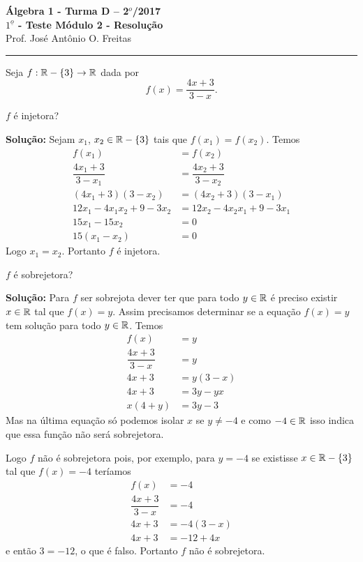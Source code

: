 \documentclass[12pt]{article}
\begin{document}


\begin{center}
{\Large\bf {\'A}lgebra 1 - Turma D -- 2$^{o}$/2017} \\ \vspace{9pt} {\large\bf
  $1^{\underline{o}}$ - Teste Módulo 2 - Resolu\c{c}\~ao}\\
\vspace{9pt} Prof. Jos{\'e} Ant{\^o}nio O. Freitas
\end{center}
\hrule

\vspace{.6cm}

Seja $f : \mathbb{R} -\{3\} \to \mathbb{R}$ dada por
\[
	f(x) = \dfrac{4x + 3}{3 - x}.
\]

\questao $f$ é injetora?

\noindent\textbf{Solu\c{c}\~ao:} Sejam $x_1$, $x_2 \in \mathbb{R} - \{3\}$ tais que $f(x_1) = f(x_2)$. Temos
\begin{align*}
	f(x_1) &= f(x_2)\\
	\dfrac{4x_1 + 3}{3 - x_1} &= \dfrac{4x_2 + 3}{3 - x_2}\\
	(4x_1 + 3)(3 - x_2) &= (4x_2 + 3)(3 - x_1)\\
	12x_1 - 4x_1x_2 + 9 - 3x_2 &= 12x_2 - 4x_2x_1 + 9 - 3x_1\\
	15x_1 - 15x_2 &= 0\\
	15(x_1 - x_2) &= 0
\end{align*}
Logo $x_1 = x_2$. Portanto $f$ é injetora.

\vspace{.5cm}

\questao $f$ é sobrejetora?

\noindent\textbf{Solu\c{c}\~ao:} Para $f$ ser sobrejota dever ter que para todo $y \in \mathbb{R}$ é preciso existir $x \in \mathbb{R}$ tal que $f(x) = y$. Assim precisamos determinar se a equação $f(x) = y$ tem solução para todo $y \in \mathbb{R}$.
Temos
\begin{align*}
	f(x) &= y\\
	\dfrac{4x + 3}{3 - x} &= y\\
	4x + 3 &= y(3 - x)\\
	4x + 3 &= 3y - yx\\
	x(4 + y) &= 3y - 3
\end{align*}
Mas na última equação só podemos isolar $x$ se $y \ne -4$ e como $-4 \in \mathbb{R}$ isso indica que essa função não será sobrejetora.

Logo $f$ não é sobrejetora pois, por exemplo, para $y = -4$ se existisse $x \in \mathbb{R} - \{3\}$ tal que $f(x) = -4$ teríamos
\begin{align*}
	f(x) &= -4\\
	\dfrac{4x + 3}{3 - x} &= -4\\
	4x + 3 &= -4(3 - x)\\
	4x + 3 &= -12 + 4x
\end{align*}
e então $3 = -12$, o que é falso.
Portanto $f$ não é sobrejetora.
\end{document}
